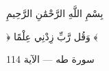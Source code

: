 \newpage
\thispagestyle{empty}


\vspace*{\fill}

\begin{center}

    {\ayahfont\fontsize{18}{28}\selectfont
        \beginR بِسْمِ اللَّهِ الرَّحْمَٰنِ الرَّحِيمِ \endR
    }

    \vspace{2.2cm}

    {\ayahfont\fontsize{36}{52}\selectfont
        \beginR ﴿ وَقُل رَّبِّ زِدْنِي عِلْمًا ﴾ \endR
    }

    \vspace{2cm}

    {\ayahfont\fontsize{15}{24}\selectfont
        \beginR سورة طه —  الآية 114 \endR
    }

\end{center}

\vspace*{\fill}
\clearpage

